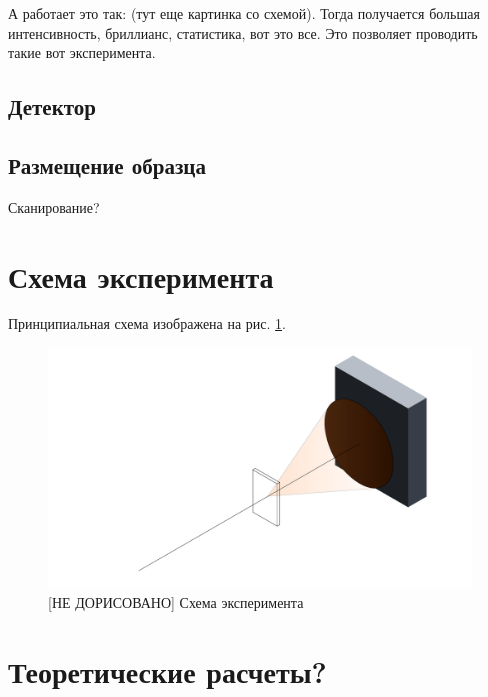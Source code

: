 А работает это так:
(тут еще картинка со схемой). Тогда получается большая интенсивность, бриллианс, статистика, вот это все. Это позволяет проводить такие вот эксперимента.

\subsection{Детектор}

\subsection{Размещение образца}
Сканирование?

\section{Схема эксперимента}
Принципиальная схема изображена на рис. \ref{fig:experiment}. 


\begin{figure}[h]
    \centering
    \includegraphics[width=\linewidth]{fig/experiment.pdf}
    \caption{[НЕ ДОРИСОВАНО] Схема эксперимента}
    \label{fig:experiment}
\end{figure}

\section{Теоретические расчеты?}


